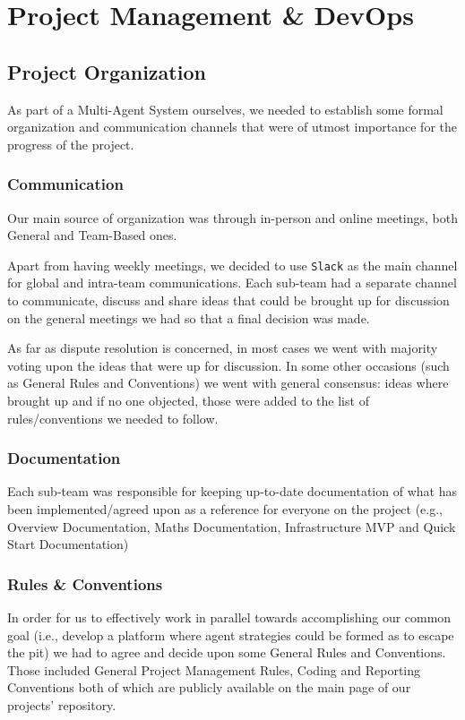 \chapter{Project Management \& DevOps}\label{DevOps}

\section{Project Organization}

As part of a Multi-Agent System ourselves, we needed to establish some formal organization and communication channels that were of utmost importance for the progress of the project.

\subsection{Communication}

Our main source of organization was through in-person and online meetings, both General and Team-Based ones.

Apart from having weekly meetings, we decided to use \texttt{Slack} as the main channel for global and intra-team communications.
Each sub-team had a separate channel to communicate, discuss and share ideas that could be brought up for discussion on the general meetings we had so that a final decision was made.

As far as dispute resolution is concerned, in most cases we went with majority voting upon the ideas that were up for discussion. In some other occasions (such as General Rules and Conventions) we went with general consensus: ideas where brought up and if no one objected, those were added to the list of rules/conventions we needed to follow.

\subsection{Documentation}

Each sub-team was responsible for keeping up-to-date documentation of what has been implemented/agreed upon as a reference for everyone on the project (e.g., Overview Documentation, Maths Documentation, Infrastructure MVP and Quick Start Documentation)

\subsection{Rules \& Conventions}

In order for us to effectively work in parallel towards accomplishing our common goal (i.e., develop a platform where agent strategies could be formed as to escape the pit) we had to agree and decide upon some General Rules and Conventions.
Those included General Project Management Rules, Coding and Reporting Conventions both of which are publicly available on the main page of our projects' repository.

